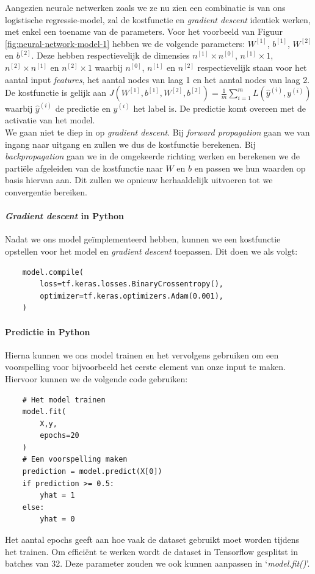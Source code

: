 Aangezien neurale netwerken zoals we ze nu zien een combinatie is van ons logistische regressie-model, zal de kostfunctie en \textit{gradient descent} identiek werken, met enkel een toename van de parameters. Voor het voorbeeld van Figuur \ref{fig:neural-network-model-1} hebben we de volgende parameters: $W^{[1]}$, $b^{[1]}$, $W^{[2]}$ en $b^{[2]}$. Deze hebben respectievelijk de dimensies $n^{[1]}\times n^{[0]}$, $n^{[1]}\times 1$, $n^{[2]}\times n^{[1]}$ en $n^{[2]}\times 1$ waarbij $n^{[0]}$, $n^{[1]}$ en $n^{[2]}$ respectievelijk staan voor het aantal input \textit{features}, het aantal nodes van laag 1 en het aantal nodes van laag 2. De kostfunctie is gelijk aan $J(W^{[1]}, b^{[1]}, W^{[2]}, b^{[2]}) = \frac{1}{m} \sum_{i=1}^{m} L(\hat{y}^{(i)}, y^{(i)})$ waarbij $\hat{y}^{(i)}$ de predictie en $y^{(i)}$ het label is. De predictie komt overeen met de activatie van het model. \\
\newline
We gaan niet te diep in op \textit{gradient descent}. Bij \textit{forward propagation} gaan we van ingang naar uitgang en zullen we dus de kostfunctie berekenen. Bij \textit{backpropagation} gaan we in de omgekeerde richting werken en berekenen we de partiële afgeleiden van de kostfunctie naar $W$ en $b$ en passen we hun waarden op basis hiervan aan. Dit zullen we opnieuw herhaaldelijk uitvoeren tot we convergentie bereiken. 

\paragraph{\textit{Gradient descent} in Python}
Nadat we ons model geïmplementeerd hebben, kunnen we een kostfunctie opstellen voor het model en \textit{gradient descent } toepassen. Dit doen we als volgt:

\begin{lstlisting}
	model.compile(
	    loss=tf.keras.losses.BinaryCrossentropy(),
	    optimizer=tf.keras.optimizers.Adam(0.001),
	)
\end{lstlisting}

\paragraph{Predictie in Python}
Hierna kunnen we ons model trainen en het vervolgens gebruiken om een voorspelling voor bijvoorbeeld het eerste element van onze input te maken. Hiervoor kunnen we de volgende code gebruiken:

\begin{lstlisting}
	# Het model trainen
	model.fit(
	    X,y,
	    epochs=20
	)
	# Een voorspelling maken
	prediction = model.predict(X[0])
	if prediction >= 0.5:
	    yhat = 1
	else:
	    yhat = 0
\end{lstlisting}
\noindent
Het aantal epochs geeft aan hoe vaak de dataset gebruikt moet worden tijdens het trainen. Om efficiënt te werken wordt de dataset in Tensorflow gesplitst in batches van 32. Deze parameter zouden we ook kunnen aanpassen in `\textit{model.fit()}'.


